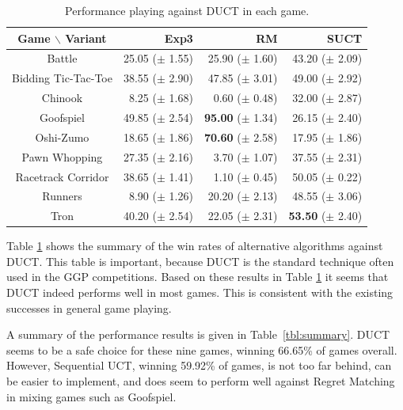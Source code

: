 \documentclass[conference]{IEEEtran}
\begin{document}
\begin{table}
\begin{center}
\begin{tabular}{|c|rrr|}
\hline
 Game $\backslash$ Variant    & Exp3		 & RM		 & SUCT		\\ 
\hline
                   Battle     & 25.05 ($\pm$ 1.55)	& 25.90 ($\pm$ 1.60)	      & 43.20 ($\pm$ 2.09)	\\ 
         Bidding Tic-Tac-Toe     & 38.55 ($\pm$ 2.90)	& 47.85 ($\pm$ 3.01)	      & 49.00 ($\pm$ 2.92)	\\ 
                  Chinook     & 8.25 ($\pm$ 1.68)	  & 0.60 ($\pm$ 0.48)	        & 32.00 ($\pm$ 2.87)	\\ 
                Goofspiel     & 49.85 ($\pm$ 2.54)	& {\bf 95.00} ($\pm$ 1.34)	& 26.15 ($\pm$ 2.40)	\\ 
                 Oshi-Zumo     & 18.65 ($\pm$ 1.86)	& {\bf 70.60} ($\pm$ 2.58)	& 17.95 ($\pm$ 1.86)	\\ 
             Pawn Whopping     & 27.35 ($\pm$ 2.16)	& 3.70 ($\pm$ 1.07)	        & 37.55 ($\pm$ 2.31)	\\ 
        Racetrack Corridor     & 38.65 ($\pm$ 1.41)	& 1.10 ($\pm$ 0.45)       	& 50.05 ($\pm$ 0.22)	\\ 
                  Runners     & 8.90 ($\pm$ 1.26)	  & 20.20 ($\pm$ 2.13)	      & 48.55 ($\pm$ 3.06)	\\ 
                     Tron     & 40.20 ($\pm$ 2.54)	& 22.05 ($\pm$ 2.31)	      & {\bf 53.50} ($\pm$ 2.40)	\\ 
\hline
\end{tabular}
\end{center}
\caption{Performance playing against DUCT in each game. \label{tbl:vsduct}}
\end{table}




Table \ref{tbl:vsduct} shows the summary of the win rates of alternative algorithms against DUCT. This table is important, because DUCT is the 
standard technique often used in the GGP competitions. Based on these results in Table \ref{tbl:vsduct} it seems that DUCT indeed performs 
well in most games. This is consistent with the existing successes in general game playing. 

A summary of the performance results is given in Table~\ref{tbl:summary}. DUCT seems to be a safe choice for these nine games, 
winning 66.65\% of games overall. 
However, Sequential UCT, winning 59.92\% of games, is not too far behind, can be easier to implement, and does seem to perform well 
against Regret Matching in mixing games such as Goofspiel.  
\end{document}
